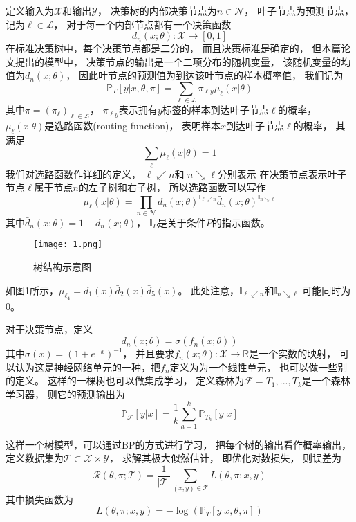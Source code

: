 \documentclass[UTF8]{ctexart}
\begin{document}
定义输入为$\mathcal{X}$和输出$\mathcal{Y}$，
决策树的内部决策节点为$n\in\mathcal{N}$，
叶子节点为预测节点，记为$\ell\in\mathcal{L}$，
对于每一个内部节点都有一个决策函数
$$
d_n(x;\theta):\mathcal{X}\rightarrow[0,1]
$$
在标准决策树中，每个决策节点都是二分的，
而且决策标准是确定的，
但本篇论文提出的模型中，
决策节点的输出是一个二项分布的随机变量，
该随机变量的均值为$d_n(x;\theta)$，
因此叶节点的预测值为到达该叶节点的样本概率值，
我们记为
$$
\mathbb{P}_T[y|x,\theta,\pi]=
\sum_{\ell\in\mathcal{L}}\pi_{\ell y}\mu_{\ell}(x|\theta)
$$
其中$\pi=(\pi_{\ell})_{\ell\in\mathcal{L}}$，
$\pi_{\ell y}$表示拥有$y$标签的样本到达叶子节点$\ell$的概率，
$\mu_{\ell}(x|\theta)$是选路函数(routing function)，
表明样本$x$到达叶子节点$\ell$的概率，
其满足
$$
\sum_{\ell}\mu_{\ell}(x|\theta)=1
$$
我们对选路函数作详细的定义，
$\ell\swarrow n$和
$n\searrow\ell$分别表示
在决策节点表示叶子节点$\ell$属于节点$n$的左子树和右子树，
所以选路函数可以写作
$$
\mu_{\ell}(x|\theta)=
\prod_{n\in\mathcal{N}}
d_n(x;\theta)^{\mathbb{I}_{\ell\swarrow n}}
\bar{d}_n(x;\theta)^{\mathbb{I}_{n\searrow\ell}}
$$
其中$\bar{d}_n(x;\theta)=1-d_n(x;\theta)$，
$\mathbb{I}_P$是关于条件$P$的指示函数。

\begin{figure}[htbp]
	\small
	\centering
	\texttt{[image: 1.png]}
	\caption{树结构示意图}
		\label{1}
\end{figure}

如图1所示，$\mu_{\ell_4}=d_1(x)\bar{d}_2(x)\bar{d}_5(x)$。
此处注意，$\mathbb{I}_{\ell\swarrow n}$和$\mathbb{I}_{n\searrow\ell}$
可能同时为$0$。

对于决策节点，定义
$$
d_n(x;\theta)=\sigma(f_n(x;\theta))
$$
其中$\sigma(x)=(1+e^{-x})^{-1}$，
并且要求$f_n(x;\theta):\mathcal{X}\rightarrow\mathbb{R}$是一个实数的映射，
可以认为这是神经网络单元的一种，把$f_n$定义为为一个线性单元，
也可以做一些别的定义。
这样的一棵树也可以做集成学习，
定义森林为$\mathcal{F}={T_1,...,T_k}$是一个森林学习器，
则它的预测输出为
$$
\mathbb{P}_{\mathcal{F}}[y|x]=
\frac{1}{k}\sum^k_{h=1}\mathbb{P}_{T_h}[y|x]
$$

这样一个树模型，可以通过BP的方式进行学习，
把每个树的输出看作概率输出，
定义数据集为$\mathcal{T}\subset\mathcal{X}\times\mathcal{Y}$，
求解其极大似然估计，
即优化对数损失，
则误差为
$$
\mathcal{R}(\theta,\pi;\mathcal{T})=
\frac{1}{|\mathcal{T}|}
\sum_{(x,y)\in\mathcal{T}}
L(\theta,\pi;x,y)
$$
其中损失函数为
$$
L(\theta,\pi;x,y) = -\log(\mathbb{P}_{T}[y|x,\theta,\pi])
$$
\end{document}
